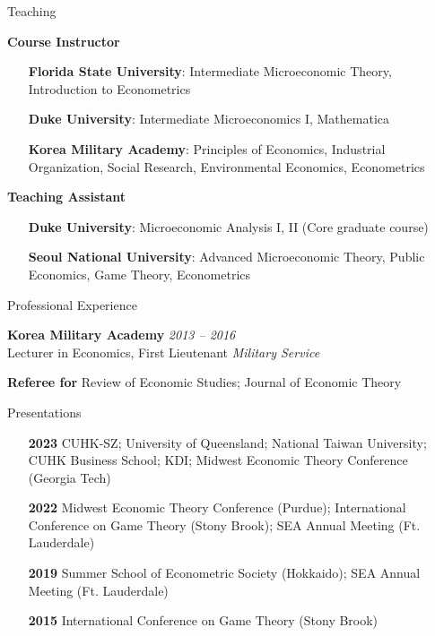 \medskip

\begin{rSection}{Teaching}
	
	
	\textbf{Course Instructor}	
	\begin{itemize}
		\item[] \textbf{Florida State University}: Intermediate Microeconomic Theory, Introduction to Econometrics
		\item[] \textbf{Duke University}: Intermediate Microeconomics I, Mathematica 
		\item[] \textbf{Korea Military Academy}: Principles of Economics, Industrial Organization, Social Research, Environmental Economics, Econometrics 
	\end{itemize}
	
	\textbf{Teaching Assistant}
	\begin{itemize}
		\item[] \textbf{Duke University}: Microeconomic Analysis I, II (Core graduate course) 
		\item[] \textbf{Seoul National University}: Advanced Microeconomic Theory, Public Economics, Game Theory, Econometrics
	\end{itemize}
	
	
	
	
\end{rSection}
\medskip


\begin{rSection}{Professional Experience}
	
	{\bf Korea Military Academy} \hfill {\em 2013 -- 2016} \\[5pt] 
	Lecturer in Economics, First Lieutenant \hfill {\em Military Service}
	
	\medskip 
	
	{\bf Referee for } Review of Economic Studies; Journal of Economic Theory
	
\end{rSection}
\medskip


\begin{rSection}{Presentations}
	
	\begin{itemize}
		\item [\textbf{2023}] CUHK-SZ; University of Queensland; National Taiwan University; CUHK Business School; KDI; Midwest Economic Theory Conference (Georgia Tech)
		\item [\textbf{2022}] Midwest Economic Theory Conference (Purdue); International Conference on Game Theory (Stony Brook); SEA Annual Meeting (Ft. Lauderdale)
		\item [\textbf{2019}] Summer School of Econometric Society (Hokkaido); SEA Annual Meeting (Ft. Lauderdale)
		\item [\textbf{2015}] International Conference on Game Theory (Stony Brook)
	\end{itemize}
	
	
\end{rSection}
\medskip

